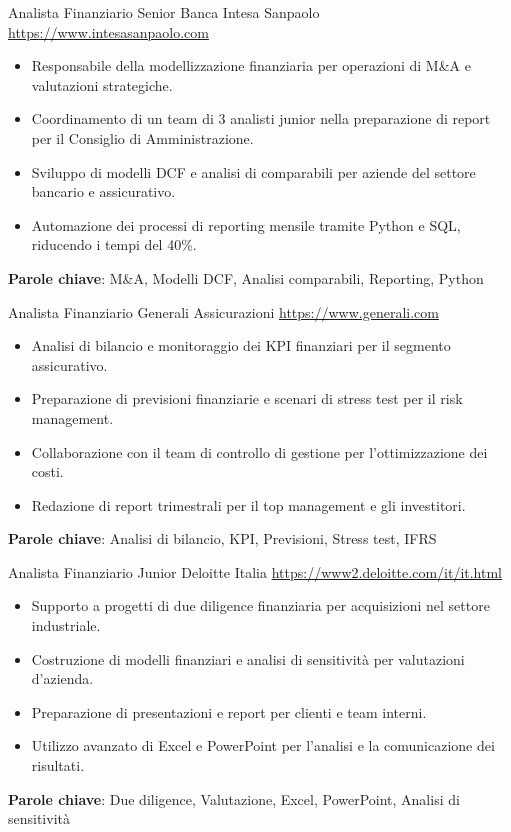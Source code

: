 \documentclass[a4paper, serif, 10pt]{moderncv}
\begin{document}
        {Analista Finanziario Senior}
        {Banca Intesa Sanpaolo}
        {\url{https://www.intesasanpaolo.com}}
        {}
        {\begin{itemize}
\item Responsabile della modellizzazione finanziaria per operazioni di M\&A e valutazioni strategiche.
\item Coordinamento di un team di 3 analisti junior nella preparazione di report per il Consiglio di Amministrazione.
\item Sviluppo di modelli DCF e analisi di comparabili per aziende del settore bancario e assicurativo.
\item Automazione dei processi di reporting mensile tramite Python e SQL, riducendo i tempi del 40\%.
\end{itemize}
\textbf{Parole chiave}: M\&A, Modelli DCF, Analisi comparabili, Reporting, Python}

        {Analista Finanziario}
        {Generali Assicurazioni}
        {\url{https://www.generali.com}}
        {}
        {\begin{itemize}
\item Analisi di bilancio e monitoraggio dei KPI finanziari per il segmento assicurativo.
\item Preparazione di previsioni finanziarie e scenari di stress test per il risk management.
\item Collaborazione con il team di controllo di gestione per l'ottimizzazione dei costi.
\item Redazione di report trimestrali per il top management e gli investitori.
\end{itemize}
\textbf{Parole chiave}: Analisi di bilancio, KPI, Previsioni, Stress test, IFRS}

        {Analista Finanziario Junior}
        {Deloitte Italia}
        {\url{https://www2.deloitte.com/it/it.html}}
        {}
        {\begin{itemize}
\item Supporto a progetti di due diligence finanziaria per acquisizioni nel settore industriale.
\item Costruzione di modelli finanziari e analisi di sensitività per valutazioni d'azienda.
\item Preparazione di presentazioni e report per clienti e team interni.
\item Utilizzo avanzato di Excel e PowerPoint per l'analisi e la comunicazione dei risultati.
\end{itemize}
\textbf{Parole chiave}: Due diligence, Valutazione, Excel, PowerPoint, Analisi di sensitività}
\end{document}
